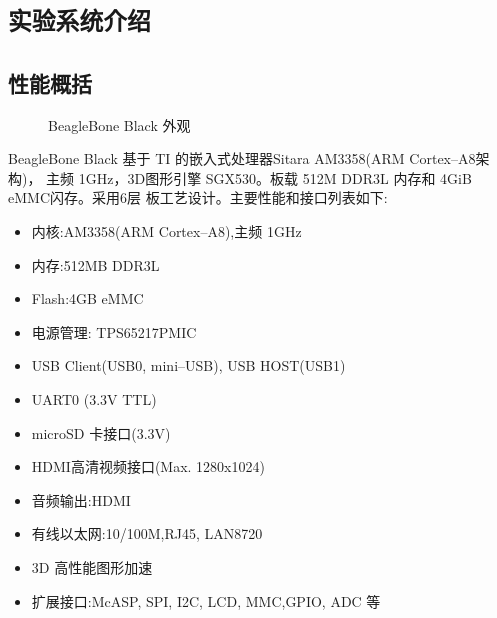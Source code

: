 \chapter{\tt 实验系统介绍}

\section{性能概括}

\begin{figure}
\centering
{}\hspace{1cm}
\caption{BeagleBone Black 外观}
\end{figure}

	BeagleBone Black 基于 TI 的嵌入式处理器Sitara AM3358(ARM Cortex--A8架构)，
主频 1GHz，3D图形引擎 SGX530。板载 512M DDR3L 内存和 4GiB eMMC闪存。采用6层
板工艺设计。主要性能和接口列表如下:
	
\begin{itemize}\itemsep=-3pt
  \item 内核:AM3358(ARM Cortex--A8),主频 1GHz
  \item 内存:512MB DDR3L
  \item Flash:4GB eMMC
  \item 电源管理: TPS65217PMIC
  \item USB Client(USB0, mini--USB), USB HOST(USB1)
  \item UART0 (3.3V TTL)
  \item microSD 卡接口(3.3V)
  \item HDMI高清视频接口(Max. 1280x1024)
  \item 音频输出:HDMI
  \item 有线以太网:10/100M,RJ45, LAN8720
  \item 3D 高性能图形加速
  \item 扩展接口:McASP, SPI, I2C, LCD, MMC,GPIO, ADC 等
\end{itemize}

